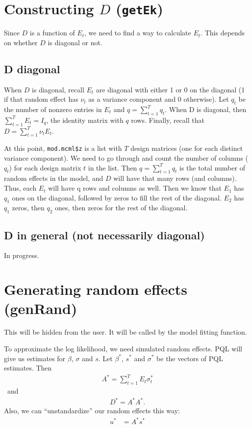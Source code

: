 \documentclass{article}
\begin{document}
\section{Constructing $D$ (\texttt{getEk})}\label{sec:getEk}
Since $D$ is a function of $E_t$, we need to find a way to calculate $E_t$. This depends on whether $D$ is diagonal or not.

\subsection{D diagonal}
When $D$ is diagonal, recall $E_t$ are diagonal with either 1 or 0 on the diagonal (1 if that random effect has $\nu_t$ as a variance component and 0 otherwise). Let $q_t$ be the number of nonzero entries in $E_t$ and $q=\sum_{t=1}^T q_t$. When D is diagonal, then $\sum_{t=1}^T E_t = I_q$, the identity matrix with $q$ rows. Finally, recall that $D=\sum_{t=1}^T \nu_t E_t$.     

At this point,  \texttt{mod.mcml\$z} is a list with $T$ design matrices (one for each distinct variance component).  We need to go through and count the  number of columns ($q_t$) for each design matrix $t$ in the list.
 Then $q=\sum_{t=1}^T q_t$ is the total number of random effects in the model, and $D$ will have that many rows (and columns). Thus, each $E_t$ will have q rows and columns as well.  Then we know that $E_1$ has $q_1$ ones on the diagonal, followed by zeros to fill the rest of the diagonal.  $E_2$ has $q_1$ zeros, then $q_2$ ones, then zeros for the rest of the diagonal.

\subsection{D in general (not necessarily diagonal)}
In progress.



\section{Generating random effects (genRand)}\label{sec:genRand}

This will be hidden from the user. It will be called by the model fitting function. 

To approximate the log likelihood, we need simulated random effects.  PQL will give us estimates for $\beta$, $\sigma$ and  $s$. Let $\beta^*$, $s^*$ and $\sigma^*$ be the vectors of PQL estimates. Then 
\begin{align}
A^*=\sum_{t=1}^T E_t \sigma^*_t
\end{align}\
and
\begin{align}
 D^* =A^*A^*.
\end{align}
Also, we can ``unstandardize'' our random effects this way:
\begin{align}
u^*&=A^*s^*
\end{align}
\end{document}
